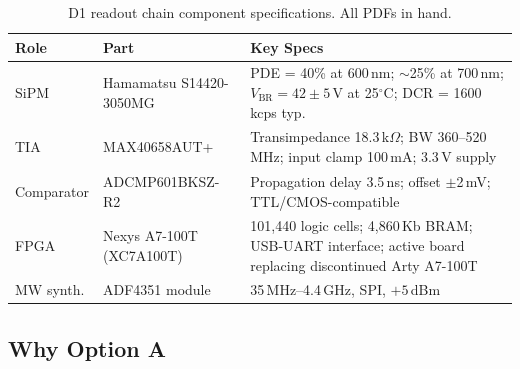 \begin{table}[ht]
\centering
\caption{D1 readout chain component specifications. All PDFs in hand.}
\label{tab:readout_components}
\small
\begin{tabular}{@{}p{2.8cm}p{3.2cm}p{6cm}@{}}
\toprule
Role & Part & Key Specs \\
\midrule
SiPM & Hamamatsu S14420-3050MG & PDE = 40\% at 600\,nm; $\sim$25\% at 700\,nm;
  $V_\mathrm{BR} = 42 \pm 5$\,V at 25$^\circ$C;
  DCR = 1600\,kcps typ.~\cite{S14420datasheet}
  \\
TIA & MAX40658AUT+ & Transimpedance 18.3\,k$\Omega$; BW 360--520\,MHz;
  input clamp 100\,mA; 3.3\,V supply~\cite{MAX40658datasheet}
  \\
Comparator & ADCMP601BKSZ-R2 & Propagation delay 3.5\,ns; offset $\pm$2\,mV;
  TTL/CMOS-compatible~\cite{ADCMP601datasheet}
  \\
FPGA & Nexys A7-100T (XC7A100T) & 101,440 logic cells; 4,860\,Kb BRAM;
  USB-UART interface; active board replacing discontinued Arty A7-100T~\cite{NexysA7refmanual}
  \\
MW synth. & ADF4351 module & 35\,MHz--4.4\,GHz, SPI, $+5$\,dBm~\cite{ADF4351datasheet}
  \\
\bottomrule
\end{tabular}
\end{table}

\subsection{Why Option A}

